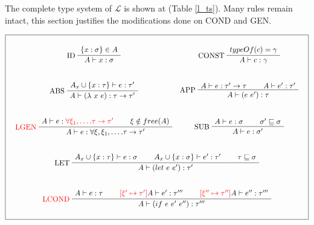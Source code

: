 \documentclass[a4paper]{report}
\newcommand{\lang}[0]{\mathcal{L}}
\newcommand{\reftab}[1]{(Table \ref{#1})}
\newcommand{\ax}[1]%
{\AxiomC{$#1$}}
\newcommand{\unc}[1]%
{\UnaryInfC{$#1$}}
\newcommand{\bic}[1]%
{\BinaryInfC{$#1$}}
\newcommand{\tric}[1]%
{\TrinaryInfC{$#1$}}
\newcommand{\drule}%
{\DisplayProof}
\begin{document}
The complete type system of $\lang$ is shown at \reftab{l_ts}. Many rules remain intact, this section justifies the modifications done on COND and GEN.
\begin{table}
\centering
$$\boxed{\begin{array}{c}\begin{array}{cc}
\\
\ax{\{x:\sigma\}\in A}
\LeftLabel{ID}
\unc{A\vdash x:\sigma}
\drule
&
\ax{typeOf(c)=\gamma}
\LeftLabel{CONST}
\unc{A\vdash c:\gamma}
\drule
\\\\\\
\ax{A_x\cup\{x:\tau\}\vdash e:\tau'}
\LeftLabel{ABS}
\unc{A\vdash(\lambda\ x\ e):\tau\to\tau'}
\drule
&
\ax{A\vdash e:\tau'\to\tau}
\ax{A\vdash e':\tau'}
\LeftLabel{APP}
\bic{A\vdash (e\ e'):\tau}
\drule
\\\\\\
\ax{A\vdash e:\textcolor{red}{\forall \xi_1,\ldots.\tau\to\tau'}}
\ax{\xi\notin free(A)}
\LeftLabel{\textcolor{red}{LGEN}}
\bic{A\vdash e:\forall\xi,\xi_1,\ldots.\tau\to\tau'}
\drule
&
\ax{A\vdash e:\sigma}
\ax{\sigma'\sqsubseteq\sigma}
\LeftLabel{SUB}
\bic{A\vdash e:\sigma'}
\drule
\end{array}
\\\\\\
\ax{A_x\cup\{x:\tau\}\vdash e:\sigma}
\ax{A_x\cup\{x:\sigma\}\vdash e':\tau'}
\ax{\tau\sqsubseteq\sigma}
\LeftLabel{LET}
\tric{A\vdash (let\ e\ e'):\tau'}
\drule
\\\\\\
\ax{A\vdash e:\tau}
\ax{\textcolor{red}{\left[\xi'\mapsto\tau'\right]}A\vdash e':\tau'''}
\ax{\textcolor{red}{\left[\xi''\mapsto\tau''\right]}A\vdash e'':\tau'''}
\LeftLabel{\textcolor{red}{LCOND}}
\tric{A\vdash (if\ e\ e'\ e''):\tau'''}
\drule
\\\\
\end{array}
}$$
\caption{The $\lang$ type system.}
\label{l_ts}
\end{table}
\end{document}
